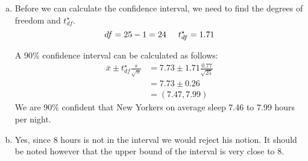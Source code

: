 
{
\begin{enumerate}[(a)]
\setlength{\itemsep}{0mm}
\item Before we can calculate the confidence interval, we need to find the degrees of freedom and $t^{\star}_{df}$.
\[ df = 25 - 1 = 24 \hspace{5mm} t^{\star}_{df} = 1.71\]

A 90\% confidence interval can be calculated as follows:
\begin{align*}
\bar{x} \pm t^{\star}_{df} \frac{s}{\sqrt{n}} &= 7.73 \pm 1.71\frac{0.77}{\sqrt{25}} \\
&= 7.73 \pm 0.26 \\
&= (7.47, 7.99)
\end{align*}
We are 90\% confident that New Yorkers on average sleep 7.46 to 7.99 hours per night.

\item Yes, since 8 hours is not in the interval we would reject his notion. It should be noted however that the upper bound of the interval is very close to 8. 

\end{enumerate}

}


